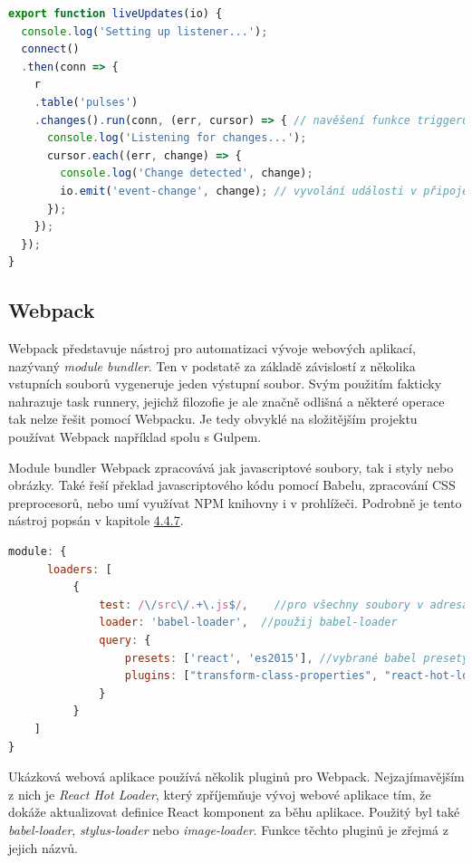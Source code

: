 \begin{lstlisting}[language=Javascript,caption={Použití triggeru v databázi RethinkDB}]
export function liveUpdates(io) {
  console.log('Setting up listener...');
  connect()
  .then(conn => {
    r
    .table('pulses')
    .changes().run(conn, (err, cursor) => { // navěšení funkce triggeru
      console.log('Listening for changes...');
      cursor.each((err, change) => {
        console.log('Change detected', change);
        io.emit('event-change', change); // vyvolání události v připojených prohlížečích
      });
    });
  });
}
\end{lstlisting}

\subsection{Webpack}
Webpack představuje nástroj pro automatizaci vývoje webových aplikací, nazývaný \textit{module bundler}. Ten v podstatě za základě závislostí z několika vstupních souborů vygeneruje jeden výstupní soubor. Svým použitím fakticky nahrazuje task runnery, jejichž filozofie je ale značně odlišná a některé operace tak nelze řešit pomocí Webpacku. Je tedy obvyklé na složitějším projektu používat Webpack například spolu s Gulpem.

Module bundler Webpack zpracovává jak javascriptové soubory, tak i styly nebo obrázky. Také řeší překlad javascriptového kódu pomocí Babelu, zpracování CSS preprocesorů, nebo umí využívat NPM knihovny i v prohlížeči. Podrobně je tento nástroj popsán v kapitole \hyperref[sec:webpack]{4.4.7}.

\begin{lstlisting}[language=Javascript, caption={Ukázka konfigurace Babel-loaderu pro webpack}]
module: {
      loaders: [
          {
              test: /\/src\/.+\.js$/,    //pro všechny soubory v adresáři src s koncovkou js...
              loader: 'babel-loader',  //použij babel-loader
              query: {
                  presets: ['react', 'es2015'], //vybrané babel presety: 
                  plugins: ["transform-class-properties", "react-hot-loader",...] //vybrané pluginy 
              }
          }
    ]
}
\end{lstlisting}

Ukázková webová aplikace používá několik pluginů pro Webpack. Nejzajímavějším z nich je \textit{React Hot Loader}, který zpříjemňuje vývoj webové aplikace tím, že dokáže aktualizovat definice React komponent za běhu aplikace. Použitý byl také \textit{babel-loader}, \textit{stylus-loader} nebo \textit{image-loader}. Funkce těchto pluginů je zřejmá z jejich názvů.

